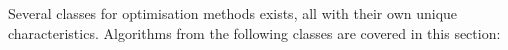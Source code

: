 Several classes for optimisation methods exists, all with their own unique characteristics. Algorithms from the following classes are covered in this section:
